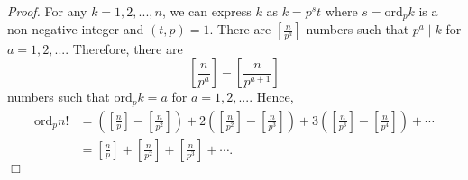 \documentclass{article}
\begin{document}
\emph{Proof.}
For any $k = 1, 2, ..., n$, we can express $k$ as $k = p^s t$
where $s = \text{ord}_p k$ is a non-negative integer and $(t, p) = 1$.
There are $[\frac{n}{p^a}]$ numbers such that $p^a \mid k$ for $a = 1, 2, ...$.
Therefore, there are $$\left[\frac{n}{p^a}\right] - \left[\frac{n}{p^{a+1}}\right]$$
numbers such that $\text{ord}_p k = a$ for $a = 1, 2, ...$. Hence,
\begin{align*}
\text{ord}_p n!
&= \left( \left[\frac{n}{p}\right] - \left[\frac{n}{p^2}\right] \right)
 + 2 \left( \left[\frac{n}{p^2}\right] - \left[\frac{n}{p^3}\right] \right)
 + 3 \left( \left[\frac{n}{p^3}\right] - \left[\frac{n}{p^4}\right] \right) + \cdots \\
&= \left[\frac{n}{p}\right] + \left[\frac{n}{p^2}\right] + \left[\frac{n}{p^3}\right] + \cdots.
\end{align*}
$\Box$ \\
\end{document}
